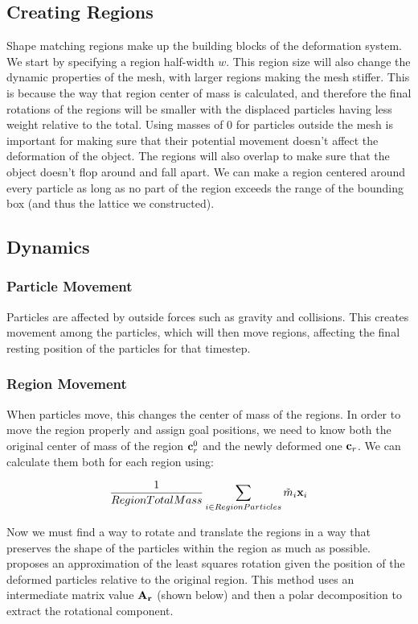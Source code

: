 \documentclass[12pt,a4paper]{amsart}
\begin{document}
	\subsection{Creating Regions}
	Shape matching regions make up the building blocks of the deformation system. We start by specifying a region half-width $w$. This region size will also change the dynamic properties of the mesh, with larger regions making the mesh stiffer. This is because the way that region center of mass is calculated, and therefore the final rotations of the regions will be smaller with the displaced particles having less weight relative to the total. Using masses of 0 for particles outside the mesh is important for making sure that their potential movement doesn't affect the deformation of the object. The regions will also overlap to make sure that the object doesn't flop around and fall apart. We can make a region centered around every particle as long as no part of the region exceeds the range of the bounding box (and thus the lattice we constructed).
	
	\subsection{Dynamics}
	
	\subsubsection{Particle Movement}
	Particles are affected by outside forces such as gravity and collisions. This creates movement among the particles, which will then move regions, affecting the final resting position of the particles for that timestep. 
	
	\subsubsection{Region Movement}
	When particles move, this changes the center of mass of the regions. In order to move the region properly and assign goal positions, we need to know both the original center of mass of the region $\bold{c}_r^0$ and the newly deformed one $\bold{c}_r$. We can calculate them both for each region using:
	
	\[ \frac{1}{Region Total Mass} \sum_{i \in Region Particles} \tilde{m}_i \bold{x}_i\]
	
	Now we must find a way to rotate and translate the regions in a way that preserves the shape of the particles within the region as much as possible.\cite{rivers} proposes an approximation of the least squares rotation given the position of the deformed particles relative to the original region. This method uses an intermediate matrix value $\bold{A_r}$ (shown below) and then a polar decomposition to extract the rotational component.
	
\end{document}
